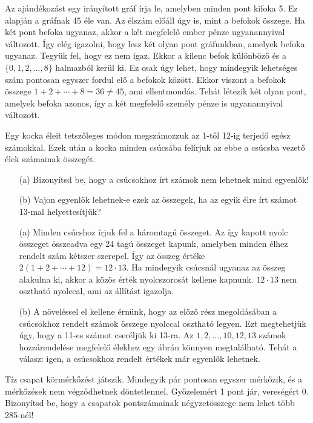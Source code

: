 \begin{solution}
Az ajándékozást egy irányított gráf írja le, amelyben minden pont
kifoka 5. Ez alapján a gráfnak 45 éle van. Az élszám előáll úgy is,
mint a befokok összege. Ha két pont befoka ugyanaz, akkor a két megfelelő
ember pénze ugyanannyival változott. Így elég igazolni, hogy lesz
két olyan pont gráfunkban, amelyek befoka ugyanaz. Tegyük fel, hogy
ez nem igaz. Ekkor a kilenc befok különböző és a $\{0,1,2,\ldots,8\}$
halmazból kerül ki. Ez csak úgy lehet, hogy mindegyik lehetséges szám
pontosan egyszer fordul elő a befokok között. Ekkor viszont a befokok
összege $1+2+\cdots+8=36\neq45$, ami ellentmondás. Tehát létezik
két olyan pont, amelyek befoka azonos, így a két megfelelő személy
pénze is ugyanannyival változott. 
\end{solution}
\begin{extraproblem}
Egy kocka éleit tetszőleges módon megszámozzuk az 1-től 12-ig terjedő
egész számokkal. Ezek után a kocka minden csúcsába felírjuk az ebbe
a csúcsba vezető élek számainak összegét. 
\begin{itemize}
\item[(a)] Bizonyítsd be, hogy a csúcsokhoz írt számok nem lehetnek mind egyenlők! 
\item[(b)] Vajon egyenlők lehetnek-e ezek az összegek, ha az egyik élre írt
számot 13-mal helyettesítjük? 
\item[(a)] Minden csúcshoz írjuk fel a háromtagú összeget. Az így kapott nyolc
összeget összeadva egy 24 tagú összeget kapunk, amelyben minden élhez
rendelt szám kétszer szerepel. Így az összeg értéke $2(1+2+\cdots+12)=12\cdot13$.
Ha mindegyik csúcsnál ugyanaz az összeg alakulna ki, akkor a közös
érték nyolcszorosát kellene kapnunk. $12\cdot13$ nem osztható nyolccal,
ami az állítást igazolja. 
\item[(b)] A növeléssel el kellene érnünk, hogy az előző rész megoldásában a
csúcsokhoz rendelt számok összege nyolccal osztható legyen. Ezt megtehetjük
úgy, hogy a 11-es számot cseréljük ki 13-ra. Az $1,2,\ldots,10,12,13$
számok hozzárendelése megfelelő élekhez egy ábrán könnyen megtalálható.
Tehát a válasz: igen, a csúcsokhoz rendelt értékek már egyenlők lehetnek. 
\end{itemize}
Tíz csapat körmérkőzést játszik. Mindegyik pár pontosan egyszer mérkőzik,
és a mérkőzések nem végződhetnek döntetlennel. Győzelemért 1 pont
jár, vereségért 0. Bizonyítsd be, hogy a csapatok pontszámainak négyzetösszege
nem lehet több 285-nél! 
\end{extraproblem}

